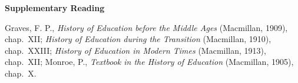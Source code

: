 \documentclass[
]{book}
\begin{document}
\textbf{Supplementary Reading}

Graves, F. P., \emph{History of Education before the Middle Ages} (Macmillan, 1909), chap.~XII; \emph{History of Education during the Transition} (Macmillan, 1910), chap.~XXIII; \emph{History of Education in Modern Times} (Macmillan, 1913), chap.~XII; Monroe, P., \emph{Textbook in the History of Education} (Macmillan, 1905), chap.~X.

  
\end{document}
